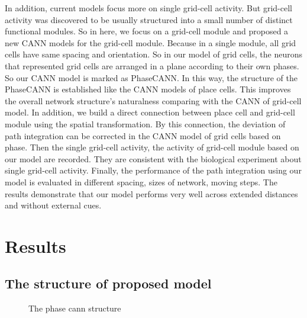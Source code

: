 \documentclass[final,5p,times,twocolumn]{elsarticle}
\begin{document}
In addition, current models focus more on single grid-cell activity. But grid-cell activity was discovered to be usually structured into a small number of distinct functional modules. So in here, we focus on a grid-cell module and proposed a new CANN models for the grid-cell module. Because in a single module, all grid cells have same spacing and orientation\citep{Stensola2012}. So in our model of grid cells, the neurons that represented grid cells are arranged in a plane according to their own phases. So our CANN model is marked as PhaseCANN. In this way, the structure of the PhaseCANN is established like the CANN models of place cells\citep{McNaughton2006}. This improves the overall network structure's naturalness comparing with the CANN of grid-cell model\citep{Guanella2007}. In addition, we build a direct connection between place cell and grid-cell module using the spatial transformation. By this connection, the deviation of path integration can be corrected in the CANN model of grid cells based on phase. Then the single grid-cell activity, the activity of grid-cell module based on our model are recorded. They are consistent with the biological experiment about single grid-cell activity\citep{Hafting2005}. Finally, the performance of the path integration using our model is evaluated in different spacing, sizes of network, moving steps. The results demonstrate that our model performs very well across extended distances and without external cues.


\section{Results}

\subsection{The structure of proposed model}\label{subsection:structure}

\begin{figure}[!t]
	\centering
	\hspace{-2pt}	

	\caption{The phase cann structure}
	\label{fig:cann_structure}
\end{figure}
\end{document}
